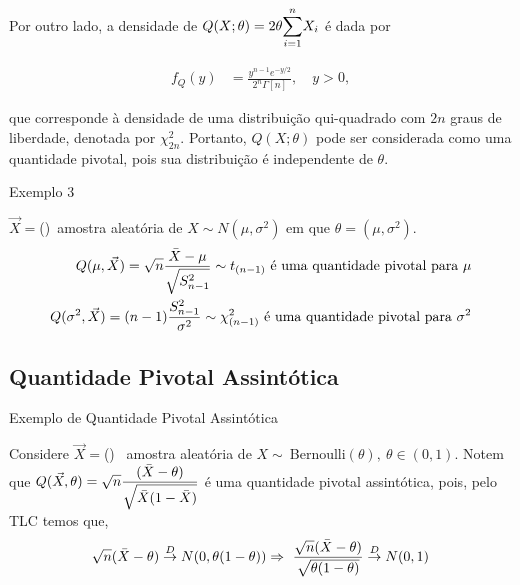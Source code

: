 \documentclass[12pt]{beamer}
\begin{document}
\begin{frame}{}
\begin{block}{}
\justifying
Por outro lado, a densidade de $Q(X;\theta) = 2\theta{\displaystyle \sum_{i=1}^{n}} X_i$ é dada por

\begin{align}
f_Q(y) &= \frac{y^{n-1}e^{-y/2}}{2^n\Gamma[n]}, \quad y > 0,
\end{align}

que corresponde à densidade de uma distribuição qui-quadrado com $2n$ graus de liberdade, denotada por $\chi^2_{2n}$. Portanto, $Q(X;\theta)$ pode ser considerada como uma quantidade pivotal, pois sua distribuição é independente de $\theta$. 
\end{block}
\end{frame}

\begin{frame}{Exemplo 3}
\begin{block}{}
\justifying
$\Vec{X}=$(\seqX)~amostra aleatória de $X\sim N(\mu,\sigma^{2})$ em que $\theta=(\mu,\sigma^{2}).$
\begin{align*}
    Q(\mu,\Vec{X})=\sqrt{n}\dfrac{\Bar{X}-\mu}{\sqrt{S^{2}_{n-1}}}\sim t_{(n-1)}~\text{é uma quantidade pivotal para}~\mu\\
     Q(\sigma^{2},\Vec{X})=(n-1)\dfrac{S_{n-1}^{2}}{\sigma^{2}}\sim \chi_{(n-1)}^{2}~\text{é uma quantidade pivotal para}~\sigma^{2}\\
\end{align*}
\end{block}
\end{frame}

\subsection{Quantidade Pivotal Assintótica}
\begin{frame}{Exemplo de Quantidade Pivotal Assintótica}
\begin{block}{}
\justifying
Considere $\Vec{X}=$(\seqX)~ amostra aleatória de $X\sim~$Bernoulli$(\theta),~\theta\in(0,1).$ Notem que $Q(\Vec{X},\theta)=\sqrt{n}\dfrac{(\Bar{X}-\theta)}{\sqrt{\Bar{X}(1-\Bar{X})}}$ é uma quantidade pivotal assintótica, pois, pelo TLC temos que, $$\sqrt{n}(\Bar{X}-\theta)\overset{D}{\rightarrow} N(0,\theta(1-\theta))\Rightarrow~\dfrac{\sqrt{n}(\Bar{X}-\theta)}{\sqrt{\theta(1-\theta)}}\overset{D}{\rightarrow} N(0,1)$$
\end{block}
\end{frame}
\end{document}
